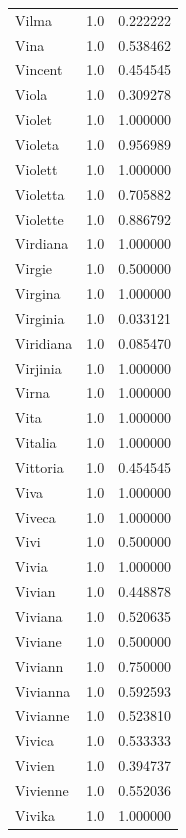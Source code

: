 \documentclass[
  letterpaper,
  DIV=11,
  numbers=noendperiod]{scrreprt}
\begin{document}
\begin{tabular}{lrr}
Vilma           &   1.0 &   0.222222 \\
Vina            &   1.0 &   0.538462 \\
Vincent         &   1.0 &   0.454545 \\
Viola           &   1.0 &   0.309278 \\
Violet          &   1.0 &   1.000000 \\
Violeta         &   1.0 &   0.956989 \\
Violett         &   1.0 &   1.000000 \\
Violetta        &   1.0 &   0.705882 \\
Violette        &   1.0 &   0.886792 \\
Virdiana        &   1.0 &   1.000000 \\
Virgie          &   1.0 &   0.500000 \\
Virgina         &   1.0 &   1.000000 \\
Virginia        &   1.0 &   0.033121 \\
Viridiana       &   1.0 &   0.085470 \\
Virjinia        &   1.0 &   1.000000 \\
Virna           &   1.0 &   1.000000 \\
Vita            &   1.0 &   1.000000 \\
Vitalia         &   1.0 &   1.000000 \\
Vittoria        &   1.0 &   0.454545 \\
Viva            &   1.0 &   1.000000 \\
Viveca          &   1.0 &   1.000000 \\
Vivi            &   1.0 &   0.500000 \\
Vivia           &   1.0 &   1.000000 \\
Vivian          &   1.0 &   0.448878 \\
Viviana         &   1.0 &   0.520635 \\
Viviane         &   1.0 &   0.500000 \\
Viviann         &   1.0 &   0.750000 \\
Vivianna        &   1.0 &   0.592593 \\
Vivianne        &   1.0 &   0.523810 \\
Vivica          &   1.0 &   0.533333 \\
Vivien          &   1.0 &   0.394737 \\
Vivienne        &   1.0 &   0.552036 \\
Vivika          &   1.0 &   1.000000 \\

\end{tabular}
\end{document}
